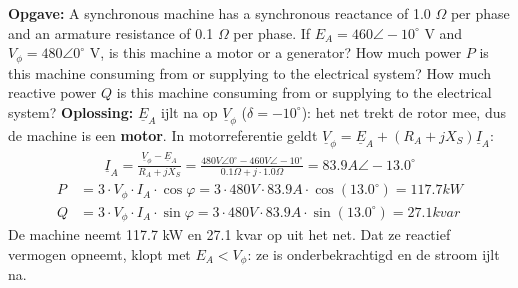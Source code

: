 \begin{oefenblok}
\textbf{Opgave:}
\newline
A synchronous machine has a synchronous reactance of 1.0 $\Omega$ per phase and an
armature resistance of 0.1 $\Omega$ per phase.
If $E_A = 460 \angle -10^\circ$ V and $V_\phi = 480 \angle 0^\circ$ V, is this machine a
motor or a generator?
How much power $P$ is this machine consuming from or supplying to the electrical system?
How much reactive power $Q$ is this machine consuming from or supplying to the electrical
system?
\newline
\textbf{Oplossing:}
\newline
$\underline{E}_A$ ijlt na op $\underline{V}_\phi$ ($\delta = -10^\circ$): het net trekt de
rotor mee, dus de machine is een \textbf{motor}.
In motorreferentie geldt $\underline{V}_\phi = \underline{E}_A + (R_A + j X_S) \underline{I}_A$:
\begin{align*}
    \underline{I}_A = \frac{\underline{V}_\phi - \underline{E}_A}{R_A + j X_S} = \frac{480 V \angle 0^\circ - 460 V \angle -10^\circ}{0.1 \Omega + j \cdot 1.0 \Omega} = 83.9 A \angle -13.0^\circ
\end{align*}
\begin{align*}
    P &= 3 \cdot V_\phi \cdot I_A \cdot \cos\varphi = 3 \cdot 480 V \cdot 83.9 A \cdot \cos(13.0^\circ) = 117.7 kW \\
    Q &= 3 \cdot V_\phi \cdot I_A \cdot \sin\varphi = 3 \cdot 480 V \cdot 83.9 A \cdot \sin(13.0^\circ) = 27.1 kvar
\end{align*}
De machine neemt 117.7 kW en 27.1 kvar op uit het net.
Dat ze reactief vermogen opneemt, klopt met $E_A < V_\phi$: ze is onderbekrachtigd en de stroom
ijlt na.
\end{oefenblok}

